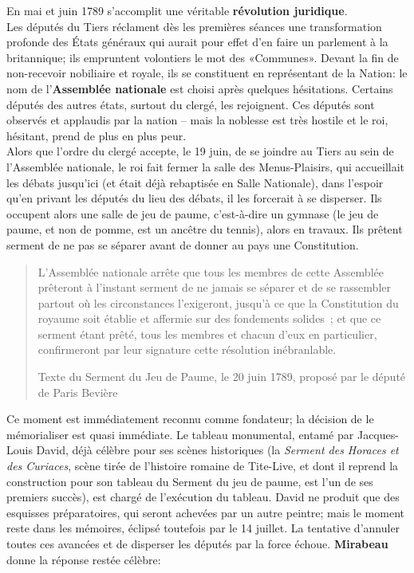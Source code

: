 \documentclass[
  french,
  letterpaper,
  DIV=11,
  numbers=noendperiod]{scrartcl}
\begin{document}
En mai et juin 1789 s'accomplit une véritable \textbf{révolution
juridique}.\\
Les députés du Tiers réclament dès les premières séances une
transformation profonde des États généraux qui aurait pour effet d'en
faire un parlement à la britannique; ils empruntent volontiers le mot
des «Communes». Devant la fin de non-recevoir nobiliaire et royale, ils
se constituent en représentant de la Nation: le nom de
l'\textbf{Assemblée nationale} est choisi après quelques hésitations.
Certains députés des autres états, surtout du clergé, les rejoignent.
Ces députés sont observés et applaudis par la nation -- mais la noblesse
est très hostile et le roi, hésitant, prend de plus en plus peur.\\
Alors que l'ordre du clergé accepte, le 19 juin, de se joindre au Tiers
au sein de l'Assemblée nationale, le roi fait fermer la salle des
Menus-Plaisirs, qui accueillait les débats jusqu'ici (et était déjà
rebaptisée en Salle Nationale), dans l'espoir qu'en privant les députés
du lieu des débats, il les forcerait à se disperser. Ils occupent alors
une salle de jeu de paume, c'est-à-dire un gymnase (le jeu de paume, et
non de pomme, est un ancêtre du tennis), alors en travaux. Ils prêtent
serment de ne pas se séparer avant de donner au pays une Constitution.

\begin{quote}
L'Assemblée nationale arrête que tous les membres de cette Assemblée
prêteront à l'instant serment de ne jamais se séparer et de se
rassembler partout où les circonstances l'exigeront, jusqu'à ce que la
Constitution du royaume soit établie et affermie sur des fondements
solides~; et que ce serment étant prêté, tous les membres et chacun
d'eux en particulier, confirmeront par leur signature cette résolution
inébranlable.

Texte du Serment du Jeu de Paume, le 20 juin 1789, proposé par le député
de Paris Bevière
\end{quote}

Ce moment est immédiatement reconnu comme fondateur; la décision de le
mémorialiser est quasi immédiate. Le tableau monumental, entamé par
Jacques-Louis David, déjà célèbre pour ses scènes historiques (la
\emph{Serment des Horaces et des Curiaces}, scène tirée de l'histoire
romaine de Tite-Live, et dont il reprend la construction pour son
tableau du Serment du jeu de paume, est l'un de ses premiers succès),
est chargé de l'exécution du tableau. David ne produit que des esquisses
préparatoires, qui seront achevées par un autre peintre; mais le moment
reste dans les mémoires, éclipsé toutefois par le 14 juillet. La
tentative d'annuler toutes ces avancées et de disperser les députés par
la force échoue. \textbf{Mirabeau} donne la réponse restée célèbre:
\end{document}
